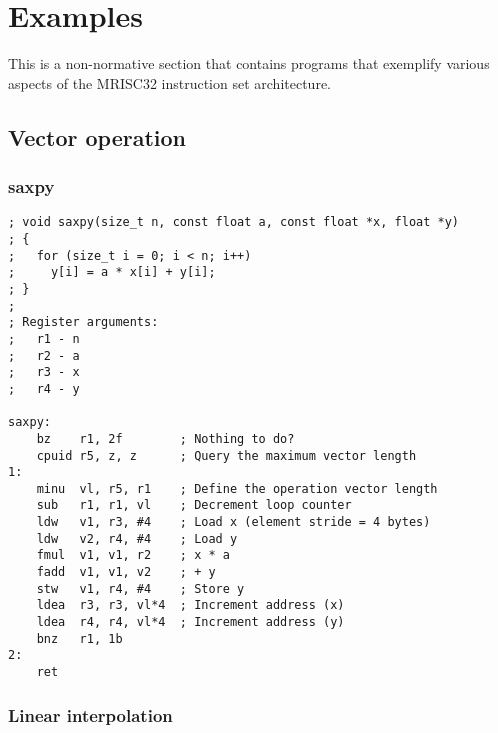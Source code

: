 %

\onecolumn

\chapter{Examples}

This is a non-normative section that contains programs that exemplify various
aspects of the MRISC32 instruction set architecture.

\section{Vector operation}

\subsection{saxpy}

\begin{lstlisting}[style=assembler]
; void saxpy(size_t n, const float a, const float *x, float *y)
; {
;   for (size_t i = 0; i < n; i++)
;     y[i] = a * x[i] + y[i];
; }
;
; Register arguments:
;   r1 - n
;   r2 - a
;   r3 - x
;   r4 - y

saxpy:
    bz    r1, 2f        ; Nothing to do?
    cpuid r5, z, z      ; Query the maximum vector length
1:
    minu  vl, r5, r1    ; Define the operation vector length
    sub   r1, r1, vl    ; Decrement loop counter
    ldw   v1, r3, #4    ; Load x (element stride = 4 bytes)
    ldw   v2, r4, #4    ; Load y
    fmul  v1, v1, r2    ; x * a
    fadd  v1, v1, v2    ; + y
    stw   v1, r4, #4    ; Store y
    ldea  r3, r3, vl*4  ; Increment address (x)
    ldea  r4, r4, vl*4  ; Increment address (y)
    bnz   r1, 1b
2:
    ret
\end{lstlisting}

\subsection{Linear interpolation}

